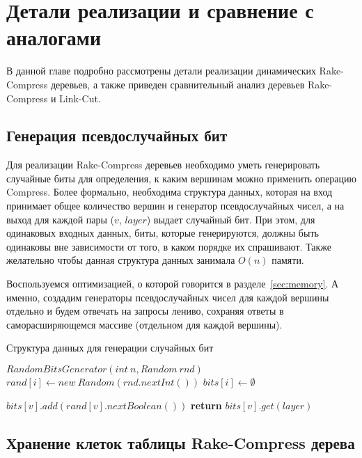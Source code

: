 \chapter{Детали реализации и сравнение с аналогами}

В данной главе подробно рассмотрены детали реализации динамических Rake-Compress деревьев, а также приведен сравнительный анализ деревьев Rake-Compress и Link-Cut.

\FloatBarrier
\section{Генерация псевдослучайных бит}    
  
Для реализации Rake-Compress деревьев необходимо уметь генерировать случайные биты для определения, к каким вершинам можно применить операцию Compress.
Более формально, необходима структура данных, которая на вход принимает общее количество вершин и генератор псевдослучайных чисел, 
а на выход для каждой пары ($v$, $layer$) выдает случайный бит. 
При этом, для одинаковых входных данных, биты, которые генерируются, должны быть одинаковы вне зависимости от того, в каком порядке их спрашивают.
Также желательно чтобы данная структура данных занимала $O(n)$ памяти.

Воспользуемся оптимизацией, о которой говорится в разделе~\ref{sec:memory}. 
А именно, создадим генераторы псевдослучайных чисел для каждой вершины отдельно и будем отвечать на запросы лениво, сохраняя ответы в саморасширяющемся массиве (отдельном для каждой вершины).


\FloatBarrier
\begin{algorithm}
\caption{Структура данных для генерации случайных бит}\label{algo:random_gen}
\begin{algorithmic}[1]
\State $RandomBitsGenerator(int \ n, Random \ rnd)$
	\State $rand[i] \gets new \ Random(rnd.nextInt())$ 
	\State $bits[i] \gets \emptyset$
\EndFor

		\State $bits[v].add(rand[v].nextBoolean())$
	\EndWhile
	\State \textbf{return} $bits[v].get(layer)$
\EndProcedure

\end{algorithmic}
\end{algorithm}

\FloatBarrier
\section{Хранение клеток таблицы Rake-Compress дерева}      

